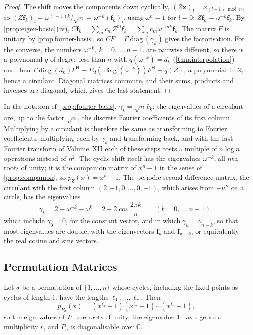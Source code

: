 \begin{proof}
The shift moves the components down cyclically, $(Z\mathbf x)_l=x_{(l-1)\bmod n}$, so $(Z\mathbf f_k)_l=\omega^{(l-1)k}/\sqrt n=\omega^{-k}(\mathbf f_k)_l$, using $\omega^n=1$ for $l=0$: $Z\mathbf f_k=\omega^{-k}\mathbf f_k$. By \cref{prop:eigen-basic}\,(iv), $C\mathbf f_k=\sum_mc_mZ^m\mathbf f_k=\sum_mc_m\omega^{-mk}\mathbf f_k$. The matrix $F$ is unitary by \cref{prop:fourier-basis}, so $CF=F\operatorname{diag}(\gamma_k)$ gives the factorisation. For the converse, the numbers $\omega^{-k}$, $k=0,\ldots,n-1$, are pairwise different, so there is a polynomial $q$ of degree less than $n$ with $q(\omega^{-k})=d_k$ (\cref{thm:interpolation}), and then $F\operatorname{diag}(d_k)F^{\mathsf H}=Fq(\operatorname{diag}(\omega^{-k}))F^{\mathsf H}=q(Z)$, a polynomial in $Z$, hence a circulant. Diagonal matrices commute, and their sums, products and inverses are diagonal, which gives the last statement.
\end{proof}

In the notation of \cref{prop:fourier-basis}, $\gamma_k=\sqrt n\,\hat c_k$: the eigenvalues of a circulant are, up to the factor $\sqrt n$, the discrete Fourier coefficients of its first column. Multiplying by a circulant is therefore the same as transforming to Fourier coefficients, multiplying each by $\gamma_k$ and transforming back, and with the fast Fourier transform of Volume~XII each of these steps costs a multiple of $n\log n$ operations instead of $n^2$. The cyclic shift itself has the eigenvalues $\omega^{-k}$, all $n$th roots of unity; it is the companion matrix of $x^n-1$ in the sense of \cref{prop:companion}, so $p_Z(x)=x^n-1$. The periodic second difference matrix, the circulant with the first column $(2,-1,0,\ldots,0,-1)$, which arises from $-u''$ on a circle, has the eigenvalues
\[
\gamma_k=2-\omega^{-k}-\omega^{k}=2-2\cos\frac{2\pi k}n\qquad(k=0,\ldots,n-1),
\]
which include $\gamma_0=0$, for the constant vector, and in which $\gamma_k=\gamma_{n-k}$, so that most eigenvalues are double, with the eigenvectors $\mathbf f_k$ and $\mathbf f_{n-k}$, or equivalently the real cosine and sine vectors.

\subsection{Permutation Matrices}

\begin{proposition}
\label{prop:permutation-eigen}
Let $\sigma$ be a permutation of $\{1,\ldots,n\}$ whose cycles, including the fixed points as cycles of length $1$, have the lengths $\ell_1,\ldots,\ell_r$. Then
\[
p_{P_\sigma}(x)=(x^{\ell_1}-1)(x^{\ell_2}-1)\cdots(x^{\ell_r}-1),
\]
so the eigenvalues of $P_\sigma$ are roots of unity, the eigenvalue $1$ has algebraic multiplicity $r$, and $P_\sigma$ is diagonalisable over $\mathbb C$.
\end{proposition}

